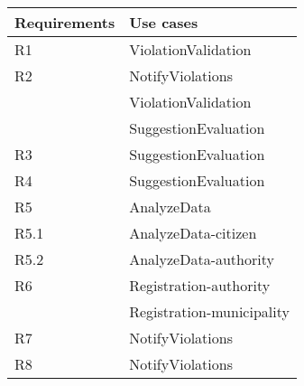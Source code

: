 \begin{tabular}{|l|>{\raggedright\arraybackslash}p{8cm}|}
	\hline 
	Requirements & Use cases \\ 
	\hline 
	R1 & ViolationValidation \\ 
	\hline 
	R2 & NotifyViolations \\ 
	   & ViolationValidation \\
	   & SuggestionEvaluation \\
	\hline 
	R3 & SuggestionEvaluation \\ 
	\hline 
	R4 & SuggestionEvaluation \\ 
	\hline 
	R5 & AnalyzeData \\ 
	\hline 
	R5.1& AnalyzeData-citizen \\ 
	\hline 
	R5.2& AnalyzeData-authority \\ 
	\hline 
	R6 & Registration-authority \\ 
	   & Registration-municipality \\
	\hline 
	R7 & NotifyViolations \\ 
	\hline 
	R8 & NotifyViolations \\ 
	\hline 
\end{tabular} 

